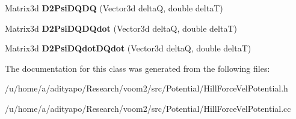 \begin{DoxyCompactItemize}
\item 
\hypertarget{classvoom_1_1_hill_force_vel_potential_aff2e66980d3975614956c315145a63d5}{
Matrix3d {\bfseries D2PsiDQDQ} (Vector3d deltaQ, double deltaT)}
\label{classvoom_1_1_hill_force_vel_potential_aff2e66980d3975614956c315145a63d5}

\item 
\hypertarget{classvoom_1_1_hill_force_vel_potential_a2c116f98bbfeff296fc970a395918e97}{
Matrix3d {\bfseries D2PsiDQDQdot} (Vector3d deltaQ, double deltaT)}
\label{classvoom_1_1_hill_force_vel_potential_a2c116f98bbfeff296fc970a395918e97}

\item 
\hypertarget{classvoom_1_1_hill_force_vel_potential_a800216f286a9a0affba94ca02f5624a7}{
Matrix3d {\bfseries D2PsiDQdotDQdot} (Vector3d deltaQ, double deltaT)}
\label{classvoom_1_1_hill_force_vel_potential_a800216f286a9a0affba94ca02f5624a7}

\end{DoxyCompactItemize}


The documentation for this class was generated from the following files:\begin{DoxyCompactItemize}
\item 
/u/home/a/adityapo/Research/voom2/src/Potential/HillForceVelPotential.h\item 
/u/home/a/adityapo/Research/voom2/src/Potential/HillForceVelPotential.cc\end{DoxyCompactItemize}
